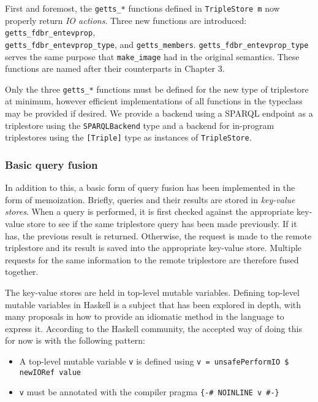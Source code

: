 \documentclass[../main.tex]{subfiles}
\begin{document}
First and foremost, the \texttt{getts\_*} functions defined in \texttt{TripleStore m} now properly return {\em IO actions}.
Three new functions are introduced: \texttt{getts\_fdbr\_entevprop},\\ \texttt{getts\_fdbr\_entevprop\_type}, and \texttt{getts\_members}.
\texttt{getts\_fdbr\_entevprop\_type} serves the same purpose that \texttt{make\_image} had in the original semantics.
These functions are named after their counterparts in Chapter 3.

Only the three \texttt{getts\_*} functions must be defined for the new type of triplestore at minimum, however efficient implementations
of all functions in the typeclass may be provided if desired.  We provide a backend using a SPARQL endpoint as a triplestore using the
\texttt{SPARQLBackend} type and a backend for in-program triplestores using the \texttt{[Triple]} type as instances of \texttt{TripleStore}.

\subsubsection{Basic query fusion}

In addition to this, a basic form of query fusion has been implemented in the form of memoization.  Briefly, queries and their results
are stored in {\em key-value stores}.  When a query is performed, it is first checked against the appropriate key-value store to see
if the same triplestore query has been made previously.  If it has, the previous result is returned.  Otherwise, the request is made to the remote
triplestore and its result is saved into the appropriate key-value store.  Multiple requests for the same information to the remote triplestore are therefore fused together.

The key-value stores are held in top-level mutable variables.  Defining top-level mutable variables in Haskell is a subject that has been explored in depth, with many proposals in how to provide an idiomatic method in the language to express it.  According to the Haskell community, the accepted way of doing this for now is with the following pattern\cite{tlmvconsensus}:

\begin{itemize}
	\item A top-level mutable variable \texttt{v} is defined using \texttt{v = unsafePerformIO \$ newIORef value} 
	\item \texttt{v} must be annotated with the compiler pragma \texttt{\{\--\# NOINLINE v \#\--\}}
\end{itemize}
\end{document}
